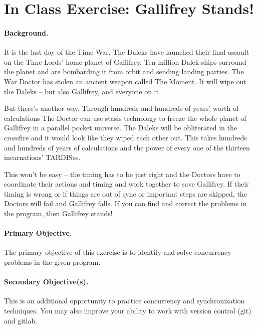 




\section*{In Class Exercise: Gallifrey Stands!}

\paragraph{Background.}
It is the last day of the Time War. The Daleks have launched their final assault on the Time Lords' home planet of Gallifrey. Ten million Dalek ships surround the planet and are bombarding it from orbit and sending landing parties. The War Doctor has stolen an ancient weapon called The Moment. It will wipe out the Daleks -- but also Gallifrey, and everyone on it.

But there's another way. Through hundreds and hundreds of years' worth of calculations The Doctor can use stasis technology to freeze the whole planet of Gallifrey in a parallel pocket universe. The Daleks will be obliterated in the crossfire and it would look like they wiped each other out. This takes hundreds and hundreds of years of calculations and the power of every one of the thirteen incarnations' TARDISes.

This won't be easy -- the timing has to be just right and the Doctors have to coordinate their actions and timing and work together to save Gallifrey. If their timing is wrong or if things are out of sync or important steps are skipped, the Doctors will fail and Gallifrey falls. If you can find and correct the problems in the program, then Gallifrey stands!


\paragraph{Primary Objective.} The primary objective of this exercise is to identify and solve concurrency problems in the given program.

\paragraph{Secondary Objective(s).} This is an additional opportunity to practice concurrency and synchronization techniques. You may also improve your ability to work with version control (git) and gitlab.

